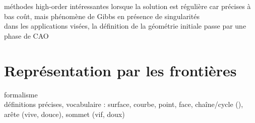 méthodes high-order intéressantes lorsque la solution est régulière car précises à bas coût, mais phénomène de Gibbs en présence de singularités \cite{bruno2007}\\

dans les applications visées, la définition de la géométrie initiale passe par une phase de CAO


\section{Représentation par les frontières}
formalisme \brep~ \cite[Section 2.2]{pentcheva2010}\\
définitions précises, vocabulaire : surface, courbe, point, face, chaîne/cycle (), arête (vive, douce), sommet (vif, doux)

\def\parampatchimagewidth{80mm}
\def\parampatchimageheight{60mm}
\def\parampatchshadowtransparency{0.4}
